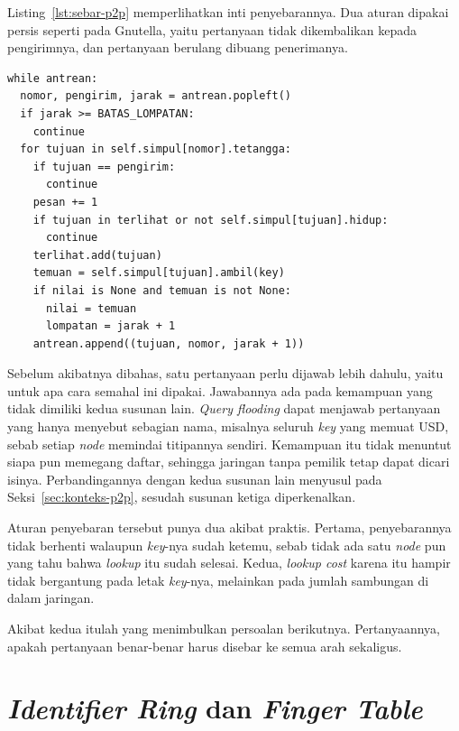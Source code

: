 Listing~\ref{lst:sebar-p2p} memperlihatkan inti penyebarannya. Dua aturan
dipakai persis seperti pada Gnutella, yaitu pertanyaan tidak dikembalikan
kepada pengirimnya, dan pertanyaan berulang dibuang penerimanya.

\begin{lstlisting}[style=PythonStyle, caption={Inti penyebaran pertanyaan,
  tersedia di \berkas{sources/chapter07/tetangga.py}}, label=lst:sebar-p2p]
while antrean:
  nomor, pengirim, jarak = antrean.popleft()
  if jarak >= BATAS_LOMPATAN:
    continue
  for tujuan in self.simpul[nomor].tetangga:
    if tujuan == pengirim:
      continue
    pesan += 1
    if tujuan in terlihat or not self.simpul[tujuan].hidup:
      continue
    terlihat.add(tujuan)
    temuan = self.simpul[tujuan].ambil(key)
    if nilai is None and temuan is not None:
      nilai = temuan
      lompatan = jarak + 1
    antrean.append((tujuan, nomor, jarak + 1))
\end{lstlisting}

Sebelum akibatnya dibahas, satu pertanyaan perlu dijawab lebih dahulu, yaitu
untuk apa cara semahal ini dipakai. Jawabannya ada pada kemampuan yang tidak
dimiliki kedua susunan lain. \textit{Query
flooding} dapat menjawab pertanyaan
yang hanya menyebut sebagian nama, misalnya seluruh \textit{key} yang memuat USD, sebab
setiap \textit{node} memindai titipannya sendiri. Kemampuan itu tidak menuntut
siapa pun memegang daftar, sehingga jaringan tanpa pemilik tetap dapat dicari
isinya. Perbandingannya dengan kedua susunan lain menyusul pada
Seksi~\ref{sec:konteks-p2p}, sesudah susunan ketiga diperkenalkan.

Aturan penyebaran tersebut punya dua akibat praktis. Pertama, penyebarannya tidak
berhenti walaupun \textit{key}-nya sudah ketemu, sebab tidak ada satu \textit{node} pun
yang tahu bahwa \textit{lookup} itu sudah selesai. Kedua, \textit{lookup
cost} karena itu hampir tidak
bergantung pada letak \textit{key}-nya, melainkan pada jumlah sambungan di dalam
jaringan.

Akibat kedua itulah yang menimbulkan persoalan berikutnya. Pertanyaannya,
apakah pertanyaan benar-benar harus disebar ke semua arah sekaligus.

\section{\textit{Identifier Ring} dan \textit{Finger Table}}
\label{sec:ring-p2p}

